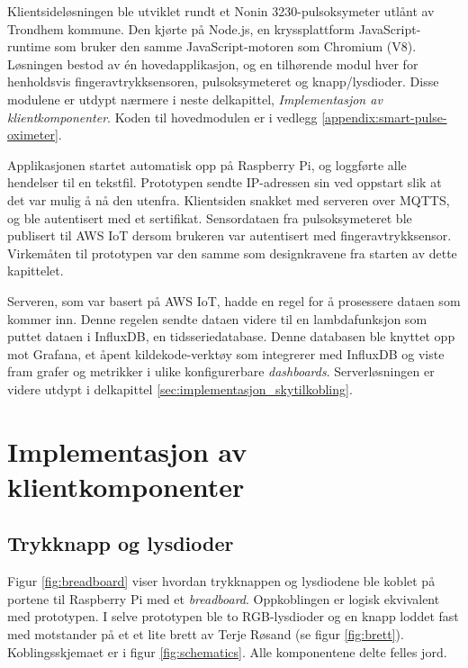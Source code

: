 Klientsideløsningen ble utviklet rundt
et Nonin 3230-pulsoksymeter utlånt av Trondhem kommune. Den kjørte på Node.js, en kryssplattform JavaScript-runtime som bruker den
samme JavaScript-motoren som Chromium (V8). Løsningen bestod av én hovedapplikasjon, og en tilhørende modul hver for henholdsvis fingeravtrykksensoren,
pulsoksymeteret og knapp/lysdioder. Disse modulene er utdypt nærmere i neste delkapittel, \textit{Implementasjon av klientkomponenter}.
Koden til hovedmodulen er i vedlegg \ref{appendix:smart-pulse-oximeter}.

Applikasjonen startet automatisk opp på Raspberry Pi, og loggførte alle hendelser til en tekstfil.
Prototypen sendte IP-adressen sin ved oppstart slik at det var mulig å nå den utenfra.
Klientsiden snakket med serveren over MQTTS, og ble autentisert med et sertifikat. Sensordataen fra pulsoksymeteret ble publisert til
AWS IoT dersom brukeren var autentisert med fingeravtrykksensor. Virkemåten til prototypen var den samme som designkravene 
fra starten av dette kapittelet.

Serveren, som var basert på AWS IoT, hadde en
regel for å prosessere dataen som kommer inn. Denne regelen sendte dataen videre til en lambdafunksjon som puttet dataen
i InfluxDB, en tidsseriedatabase. Denne databasen ble knyttet opp mot Grafana, et åpent kildekode-verktøy som integrerer
med InfluxDB og viste fram grafer og metrikker i ulike konfigurerbare \textit{dashboards}.
Serverløsningen er videre utdypt i delkapittel \ref{sec:implementasjon_skytilkobling}.

\section{Implementasjon av klientkomponenter}

\subsection{Trykknapp og lysdioder}
Figur \ref{fig:breadboard} viser hvordan trykknappen og lysdiodene ble koblet på
portene til Raspberry Pi med et \textit{breadboard}. Oppkoblingen er logisk ekvivalent med prototypen.
I selve prototypen ble to RGB-lysdioder og en knapp loddet fast med motstander på et et lite brett av Terje Røsand (se figur \ref{fig:brett}).
Koblingsskjemaet er i figur \ref{fig:schematics}. Alle komponentene delte felles jord.

